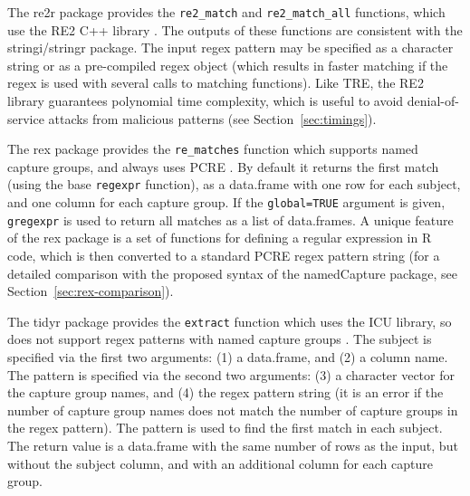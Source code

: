 The re2r package provides the \verb|re2_match| and
\verb|re2_match_all| functions, which use the RE2 C++ library
\citep{re2r}. The outputs of these functions are consistent with the
stringi/stringr package. The input regex pattern may be specified as
a character string or as a pre-compiled regex object (which
results in faster matching if the regex is used with several calls to
matching functions). Like TRE, the RE2 library guarantees polynomial
time complexity, which is useful to avoid denial-of-service attacks
from malicious patterns (see Section~\ref{sec:timings}).

The rex package provides the \verb|re_matches| function which supports
named capture groups, and always uses PCRE \citep{rex}. By default it
returns the first match (using the base \verb|regexpr| function), as a
data.frame with one row for each subject, and one column for each
capture group. If the \verb|global=TRUE| argument is given,
\verb|gregexpr| is used to return all matches as a list of
data.frames. A unique feature of the rex package is a set of functions
for defining a regular expression in R code, which is then converted
to a standard PCRE regex pattern string (for a detailed comparison
with the proposed syntax of the namedCapture package, see
Section~\ref{sec:rex-comparison}).

The tidyr package provides the \verb|extract| function which uses the
ICU library, so does not support regex patterns with named capture
groups \citep{tidyr}. The subject is specified via the first two
arguments: (1) a data.frame, and (2) a column name. The pattern is
specified via the second two arguments: (3) a character vector for the
capture group names, and (4) the regex pattern string (it is an error
if the number of capture group names does not match the number of
capture groups in the regex pattern). The pattern is used to find the
first match in each subject. The return value is a data.frame with the
same number of rows as the input, but without the subject column, and
with an additional column for each capture group.

